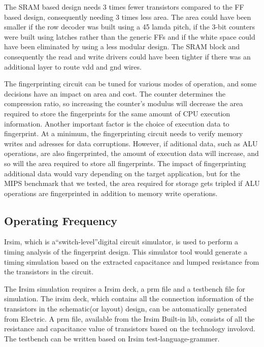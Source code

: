 \documentclass[10pt,journal,compsoc]{IEEEtran}
\begin{document}
The SRAM based design needs 3 times fewer transistors compared to the FF based design, consequently needing 3 times less area. The area could have been smaller if the row decoder was built using a 45 lamda pitch, if the 3-bit counters were built using latches rather than the generic FFs and if the white space could have been eliminated by using a less modular design. The SRAM block and consequently the read and write drivers could have been tighter if there was an additional layer to route vdd and gnd wires.	

The fingerprinting circuit can be tuned for various modes of operation, and some decisions have an impact on area and cost. The counter determines the compression ratio, so increasing the counter's modulus will decrease the area required to store the fingerprints for the same amount of CPU execution information. Another important factor is the choice of execution data to fingerprint. At a minimum, the fingerprinting circuit needs to verify memory writes and adresses for data corruptions. However, if aditional data, such as ALU operations, are also fingerprinted, the amount of execution data will increase, and so will the area required to store all fingerprints. The impact of fingerprinting additional data would vary depending on the target application, but for the MIPS benchmark that we tested, the area required for storage gets tripled if ALU operations are fingerprinted in addition to memory write operations. 

\subsection{Operating Frequency}
Irsim, which is a“switch-level”digital circuit simulator, is used to perform a timing analysis of the fingerprint design. This simulator tool would generate a timing simulation based on the extracted capacitance and lumped resistance from the transistors in the circuit.
    
    The Irsim simulation requires a Irsim deck, a prm file and a testbench file for simulation. The irsim deck, which contains all the connection information of the transistors in the schematic(or layout) design, can be automatically generated from Electric. A prm file, available from the Irsim Built-in lib, consists of all the resistance and capacitance value of transistors based on the technology involovd. The testbench can be written based on Irsim test-language-grammer.
    
\end{document}
